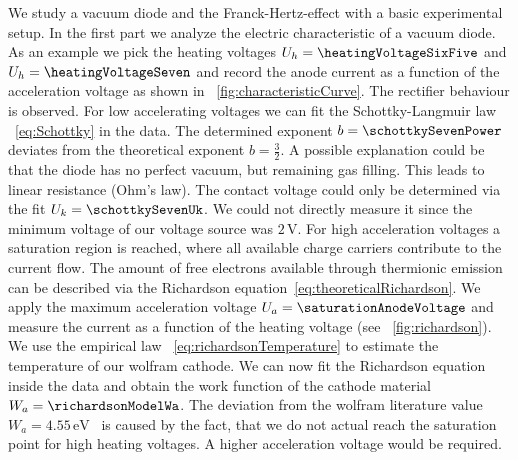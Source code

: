 \documentclass[a4paper,10pt,twocolumn]{article}
\newcommand{\wolframWa}{4.55\, \mathrm{eV}}
\newcommand{\volt}{\, \mathrm{V}}
\newcommand{\minvoltage}{2 \volt}
\begin{document}
    We study a vacuum diode and the Franck-Hertz-effect with a basic experimental setup.
    In the first part we analyze the electric characteristic of a vacuum diode.
    As an example we pick the heating voltages $U_h = \heatingVoltageSixFive$ and $U_h = \heatingVoltageSeven$
    and record the anode current as a function of the acceleration voltage as shown in ~\autoref{fig:characteristicCurve}.
    The rectifier behaviour is observed.
    For low accelerating voltages we can fit the Schottky-Langmuir law ~\eqref{eq:Schottky} in the data.
    The determined exponent $b = \schottkySevenPower$ deviates from the theoretical exponent $b = \frac{3}{2}$.
    A possible explanation could be that the diode has no perfect vacuum, but remaining gas filling.
    This leads to linear resistance (Ohm's law).
    The contact voltage could only be determined via the fit $U_k = \schottkySevenUk$.
    We could not directly measure it since the minimum voltage of our voltage source was $\minvoltage$.
    For high acceleration voltages a saturation region is reached, where all available charge carriers 
    contribute to the current flow.
    The amount of free electrons available through thermionic emission can be described
    via the Richardson equation~\eqref{eq:theoreticalRichardson}.
    We apply the maximum acceleration voltage $U_a = \saturationAnodeVoltage$ and measure the current
    as a function of the heating voltage (see ~\autoref{fig:richardson}).
    We use the empirical law ~\eqref{eq:richardsonTemperature} to estimate the temperature of our wolfram cathode.
    We can now fit the Richardson equation inside the data and obtain the work function of the cathode material
    $W_a = \richardsonModelWa$.
    The deviation from the wolfram literature value $W_a = \wolframWa$~\cite{wolfram} is caused by the fact, that
    we do not actual reach the saturation point for high heating voltages.
    A higher acceleration voltage would be required.
    
\end{document}
